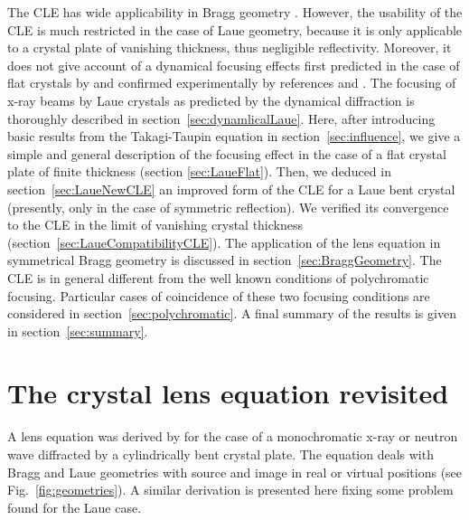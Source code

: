 \documentclass[preprint]{iucr}              %
\begin{document}
The CLE has wide applicability in Bragg geometry \cite{Caciuffo1987}. However, the usability of the CLE is much restricted in the case of Laue geometry, because it is only applicable to a crystal plate of vanishing thickness, thus negligible reflectivity. Moreover, it does not give account of a dynamical focusing effects first  predicted in the case of flat crystals by \cite{AfanasevKohn1977} and confirmed experimentally by references \cite{Aristov1978} and \cite{Aristov1980}. The focusing of x-ray beams by Laue crystals as predicted by the dynamical diffraction is  thoroughly described in section~\ref{sec:dynamlicalLaue}. Here, after introducing basic results from the Takagi-Taupin equation in section~\ref{sec:influence}, we give a simple and general description of the focusing effect in the case of a flat crystal plate of finite thickness (section \ref{sec:LaueFlat}). Then, we deduced in section~\ref{sec:LaueNewCLE} an improved form of the CLE for a Laue bent crystal (presently, only in the case of symmetric reflection). We verified its convergence to the CLE in the limit of vanishing crystal thickness (section~\ref{sec:LaueCompatibilityCLE}). 
The application of the lens equation in symmetrical Bragg geometry is discussed in section~\ref{sec:BraggGeometry}. %
The CLE is in general different from the well known conditions of polychromatic focusing. Particular cases of coincidence of these two focusing conditions are considered in section~\ref{sec:polychromatic}. A final summary of the results is given in section~\ref{sec:summary}.   


\section{The crystal lens equation revisited}
\label{sec:CLE}

A lens equation was derived by \cite{CK} for the case of a monochromatic x-ray or neutron wave diffracted by a cylindrically bent crystal plate. The equation deals with Bragg and Laue geometries with source and image in real or virtual positions (see Fig.~\ref{fig:geometries}). A similar derivation is presented here fixing some problem found for the Laue case.
\end{document}
